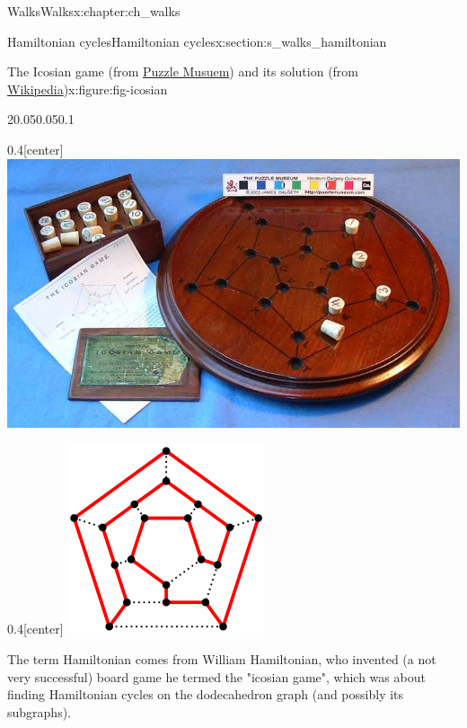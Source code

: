 \documentclass[oneside,10pt,]{book}
\numberwithin{equation}{section}
\begin{document}
\begin{chapterptx}{Walks}{}{Walks}{}{}{x:chapter:ch_walks}
\begin{sectionptx}{Hamiltonian cycles}{}{Hamiltonian cycles}{}{}{x:section:s_walks_hamiltonian}
\begin{figureptx}{The Icosian game (from \href{https://www.puzzlemuseum.com/month/picm02/200207icosian.htm}{Puzzle Musuem}) and its solution (from \href{https://en.wikipedia.org/wiki/Icosian_game}{Wikipedia})}{x:figure:fig-icosian}{}
\begin{sidebyside}{2}{0.05}{0.05}{0.1}
\begin{sbspanel}{0.4}[center]
\includegraphics[width=\linewidth]{images/icosiangame.jpg}
\end{sbspanel}%
\begin{sbspanel}{0.4}[center]%
\includegraphics[width=\linewidth]{images/icosiansolved.png}
\end{sbspanel}%
\end{sidebyside}%
\tcblower
\end{figureptx}%
The term Hamiltonian comes from William Hamiltonian, who invented (a not very successful) board game he termed the "icosian game", which was about finding Hamiltonian cycles on the dodecahedron graph (and possibly its subgraphs).%
\par

\end{sectionptx}
\end{chapterptx}
\end{document}
